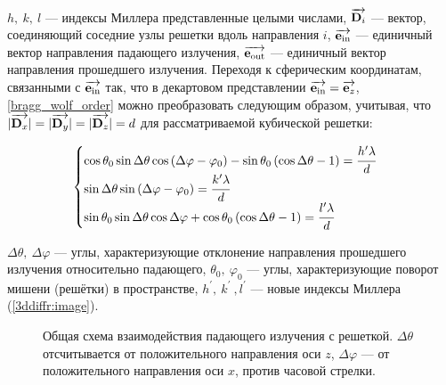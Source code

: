  $h,\:k,\:l$ --- индексы Миллера представленные целыми числами, $\overrightarrow{\textbf{D}_{i}}$ --- вектор, соединяющий соседние узлы решетки вдоль направления $i$, $\overrightarrow{\textbf{e}_{\textrm{in}}}$ --- единичный вектор направления падающего излучения, $\overrightarrow{\textbf{e}_{\textrm{out}}}$ --- единичный вектор направления прошедшего излучения. Переходя к сферическим координатам, связанными с $\overrightarrow{\textbf{e}_{\textrm{in}}}$ так, что в декартовом представлении $\overrightarrow{\textbf{e}_{\textrm{in}}} = \overrightarrow{\textbf{e}_{z}}$, \autoref{bragg_wolf_order} можно преобразовать следующим образом, учитывая, что $|\overrightarrow{\textbf{D}_{x}}| = |\overrightarrow{\textbf{D}_{y}}| = |\overrightarrow{\textbf{D}_{z}}| = d$ для рассматриваемой кубической решетки:

    \begin{equation}
        \begin{cases}
            \cos{\theta_0}\sin{\Delta \theta}\cos{\left( \Delta \varphi - \varphi_0 \right)} - \sin{\theta_0} \left( \cos{\Delta \theta} - 1 \right) = \cfrac{h^{\prime} \lambda}{d}
            \\
            \sin{\Delta \theta} \sin{\left( \Delta \varphi - \varphi_0 \right)} = \cfrac{k^{\prime} \lambda}{d}
            \\
            \sin{\theta_0}\sin{\Delta \theta}\cos{\Delta \varphi} + \cos{\theta_0} \left( \cos{\Delta \theta} - 1 \right)= \cfrac{l^{\prime} \lambda}{d}
        \end{cases}
        \label{bragg_wolf_order_spherical}
    \end{equation}

 $\Delta \theta,\:\Delta \varphi$ --- углы, характеризующие отклонение направления прошедшего излучения относительно падающего, $\theta_0,\:\varphi_0$ --- углы, характеризующие поворот мишени (решётки) в пространстве, $h^\prime,\:k^\prime\:,l^\prime$ --- новые индексы Миллера (\autoref{3ddiffr:image}).

    \begin{figure}[ht]
        \hfil
        \caption{Общая схема взаимодействия падающего излучения с решеткой. $\Delta \theta$ отсчитывается от положительного направления оси $z$, $\Delta \varphi$ --- от положительного направления оси $x$, против часовой стрелки.}\label{3ddiffr:image}
    \end{figure}


